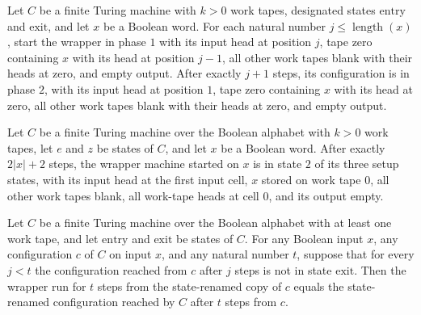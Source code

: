 \begin{lemma}
\label{Complexity.a3_load_rewind}
\leanok
{}
Let $C$ be a finite Turing machine with $k>0$ work tapes, designated states
$\mathrm{entry}$ and $\mathrm{exit}$, and let $x$ be a Boolean word. For each natural
number $j\leq \operatorname{length}(x)$, start the wrapper in phase $1$ with its input
head at position $j$, tape zero containing $x$ with its head at position $j-1$, all
other work tapes blank with their heads at zero, and empty output. After exactly $j+1$
steps, its configuration is in phase $2$, with its input head at position $1$, tape zero
containing $x$ with its head at zero, all other work tapes blank with their heads at
zero, and empty output.
\end{lemma}

\begin{lemma}
\label{Complexity.a3_run_start}
\leanok
{}
Let $C$ be a finite Turing machine over the Boolean alphabet with $k>0$ work tapes, let
$e$ and $z$ be states of $C$, and let $x$ be a Boolean word. After exactly $2|x|+2$
steps, the wrapper machine started on $x$ is in state $2$ of its three setup states,
with its input head at the first input cell, $x$ stored on work tape $0$, all other work
tapes blank, all work-tape heads at cell $0$, and its output empty.
\end{lemma}

\begin{lemma}
\label{Complexity.a3_run_guarded}
\leanok
{}
Let $C$ be a finite Turing machine over the Boolean alphabet with at least one work
tape, and let $\mathrm{entry}$ and $\mathrm{exit}$ be states of $C$. For any Boolean
input $x$, any configuration $c$ of $C$ on input $x$, and any natural number $t$,
suppose that for every $j<t$ the configuration reached from $c$ after $j$ steps is not
in state $\mathrm{exit}$. Then the wrapper run for $t$ steps from the state-renamed copy
of $c$ equals the state-renamed configuration reached by $C$ after $t$ steps from $c$.
\end{lemma}


